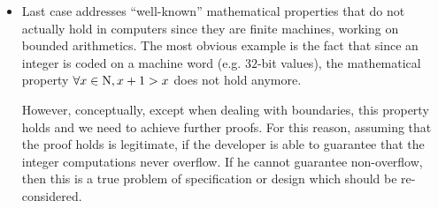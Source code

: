 \begin{itemize}
\begin{itemize}
      \item Last case addresses ``well-known'' mathematical properties
        that do not actually hold in computers since they are finite
        machines, working on bounded arithmetics. The most obvious
        example is the fact that since an integer is coded on a
        machine word (e.g. $32$-bit values), the
        mathematical property $\forall x \in \mbox{\cal{N}}, x + 1 >
        x$ does not hold anymore.


        \vspace{0.1cm}
        However, conceptually, except when dealing with boundaries,
        this property holds and we need to achieve further proofs. For
        this reason, assuming that the proof holds is legitimate, if the
        developer is able to guarantee that the integer computations
        never overflow. If he cannot guarantee non-overflow, then this
        is a true problem of specification or design which should be
        re-considered.
    \end{itemize}


\end{itemize}
